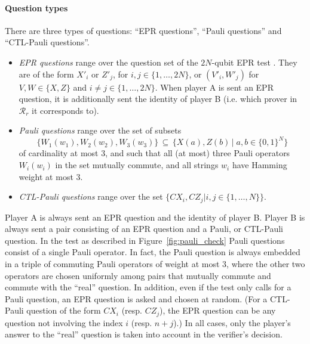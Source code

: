 \paragraph{Question types}
There are three types of questions: ``EPR questions'', ``Pauli questions'' and ``CTL-Pauli questions''. 
\begin{itemize}
\item \emph{EPR questions} range over the question set of the $2N$-qubit EPR test . They are of the form $X'_i$ or $Z'_j$, for $i,j\in\{1,\ldots,2N\}$, or $(V'_i,W'_j)$ for $V,W\in\{X,Z\}$ and $i\neq j \in \{1,\ldots,2N\}$.  When player A is sent an EPR question, it is additionally sent the identity of player B (i.e. which prover in $\mathcal{R}_r$ it corresponds to).
\item \emph{Pauli questions} range over the set of subsets 
$$\{W_1(w_1),W_2(w_2),W_3(w_3)\}\,\subseteq\,\{X(a),Z(b)\,|\; a,b\in\{0,1\}^N\}$$
 of cardinality at most $3$, and such that all (at most) three Pauli operators $W_i(w_i)$ in the set mutually commute, and all strings $w_i$ have Hamming weight at most $3$.
\item \emph{CTL-Pauli questions} range over the set $\{CX_i,CZ_j|i,j\in\{1,\ldots,N\}\}$.
\end{itemize}
Player A is always sent an EPR question and the identity of player B. Player B is always sent a pair consisting of an EPR question and a Pauli, or CTL-Pauli question. In the test as described in Figure~\ref{fig:pauli_check} Pauli questions consist of a single Pauli operator. In fact, the Pauli question is always embedded in a triple of commuting Pauli operators of weight at most $3$, where the other two operators are chosen uniformly among pairs that mutually commute and commute with the ``real'' question. In addition, even if the test only calls for a Pauli question, an EPR question is asked and chosen at random. (For a CTL-Pauli question of the form $CX_i$ (resp. $CZ_j$), the EPR question can be any question not involving the index $i$ (resp. $n+j$).) In all cases, only the player's answer to the ``real'' question is taken into account in the verifier's decision. 

